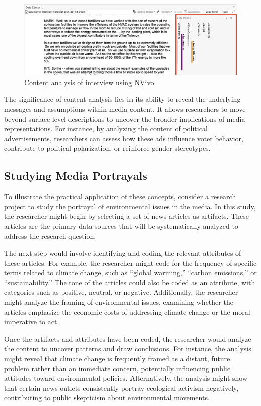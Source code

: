 \documentclass[
]{book}
\begin{document}
\begin{figure}
\centering
\includegraphics{images/fig01b.jpg}
\caption{Content analysis of interview using NVivo}
\end{figure}

The significance of content analysis lies in its ability to reveal the underlying messages and assumptions within media content. It allows researchers to move beyond surface-level descriptions to uncover the broader implications of media representations. For instance, by analyzing the content of political advertisements, researchers can assess how these ads influence voter behavior, contribute to political polarization, or reinforce gender stereotypes.

\subsection*{Studying Media Portrayals}\label{studying-media-portrayals}

To illustrate the practical application of these concepts, consider a research project to study the portrayal of environmental issues in the media. In this study, the researcher might begin by selecting a set of news articles as artifacts. These articles are the primary data sources that will be systematically analyzed to address the research question.

The next step would involve identifying and coding the relevant attributes of these articles. For example, the researcher might code for the frequency of specific terms related to climate change, such as ``global warming,'' ``carbon emissions,'' or ``sustainability.'' The tone of the articles could also be coded as an attribute, with categories such as positive, neutral, or negative. Additionally, the researcher might analyze the framing of environmental issues, examining whether the articles emphasize the economic costs of addressing climate change or the moral imperative to act.

Once the artifacts and attributes have been coded, the researcher would analyze the content to uncover patterns and draw conclusions. For instance, the analysis might reveal that climate change is frequently framed as a distant, future problem rather than an immediate concern, potentially influencing public attitudes toward environmental policies. Alternatively, the analysis might show that certain news outlets consistently portray ecological activism negatively, contributing to public skepticism about environmental movements.
\end{document}
